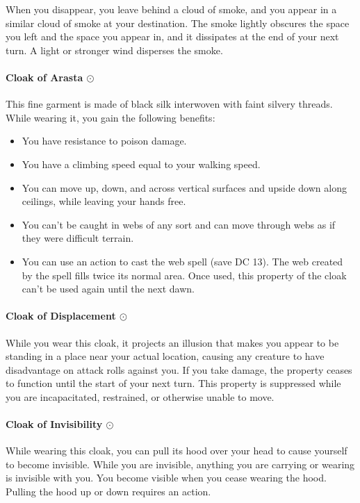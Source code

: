         When you disappear, you leave behind a cloud of smoke, and you appear in a similar cloud of smoke at your destination.
        The smoke lightly obscures the space you left and the space you appear in, and it dissipates at the end of your next turn. A light or stronger wind disperses the smoke.
    \paragraph{Cloak of Arasta $\odot$}
        This fine garment is made of black silk interwoven with faint silvery threads.
        While wearing it, you gain the following benefits:
        \begin{itemize}
            \item You have resistance to poison damage.
            \item You have a climbing speed equal to your walking speed.
            \item You can move up, down, and across vertical surfaces and upside down along ceilings, while leaving your hands free.
            \item You can't be caught in webs of any sort and can move through webs as if they were difficult terrain.
            \item You can use an action to cast the web spell (save DC 13).
            The web created by the spell fills twice its normal area.
            Once used, this property of the cloak can't be used again until the next dawn.
        \end{itemize}
    \paragraph{Cloak of Displacement $\odot$}
        While you wear this cloak, it projects an illusion that makes you appear to be standing in a place near your actual location, causing any creature to have disadvantage on attack rolls against you.
        If you take damage, the property ceases to function until the start of your next turn.
        This property is suppressed while you are incapacitated, restrained, or otherwise unable to move.
    \paragraph{Cloak of Invisibility $\odot$}
        While wearing this cloak, you can pull its hood over your head to cause yourself to become invisible.
        While you are invisible, anything you are carrying or wearing is invisible with you.
        You become visible when you cease wearing the hood.
        Pulling the hood up or down requires an action.

